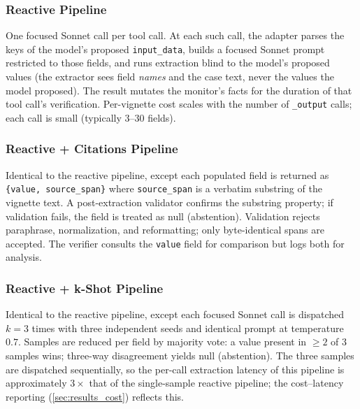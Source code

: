 \subsubsection{Reactive Pipeline}
\label{sec:methods_extractor_reactive}

One focused Sonnet call per
 tool call. At each such call,
the adapter parses the keys of the model's proposed
\verb|input_data|, builds a focused Sonnet prompt restricted to those
fields, and runs extraction blind to the model's proposed values
(the extractor sees field \emph{names} and the case text, never the
values the model proposed). The result mutates the monitor's facts
for the duration of that tool call's verification. Per-vignette
cost scales with the number of \verb|_output| calls; each call is
small (typically 3--30 fields).

\subsubsection{Reactive + Citations Pipeline}
\label{sec:methods_extractor_citations}

Identical to the reactive pipeline, except each populated field is
returned as \texttt{\{value, source\_span\}} where
\texttt{source\_span} is a verbatim substring of the vignette text.
A post-extraction validator confirms the substring property; if
validation fails, the field is treated as null (abstention).
Validation rejects paraphrase, normalization, and reformatting; only
byte-identical spans are accepted. The verifier consults the
\texttt{value} field for comparison but logs both for analysis.

\subsubsection{Reactive + k-Shot Pipeline}
\label{sec:methods_extractor_kshot}

Identical to the reactive pipeline, except each focused Sonnet call
is dispatched $k=3$ times with three independent seeds and identical
prompt at temperature $0.7$. Samples are reduced per field by
majority vote: a value present in $\ge 2$ of $3$ samples wins;
three-way disagreement yields null (abstention). The three samples
are dispatched sequentially, so the per-call extraction latency of
this pipeline is approximately $3\times$ that of the single-sample
reactive pipeline; the cost--latency reporting
(\cref{sec:results_cost}) reflects this.

